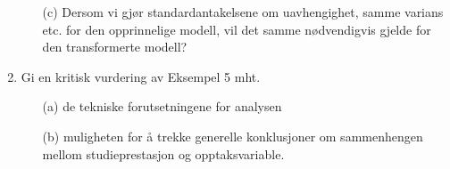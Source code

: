 \begin{enumerate}
\begin{itemize}
\item[(c)] Dersom vi gjør standardantakelsene om uavhengighet, samme
varians etc. for den opprinnelige modell, vil det samme nødvendigvis gjelde
for den transformerte modell?
\end{itemize}

\item
Gi en kritisk vurdering av Eksempel 5 mht.
\begin{itemize}
\item[(a)] de tekniske forutsetningene for analysen
\item[(b)] muligheten for å trekke generelle konklusjoner om 
sammenhengen mellom studieprestasjon og opptaksvariable.
\end {itemize}
\end {enumerate}
